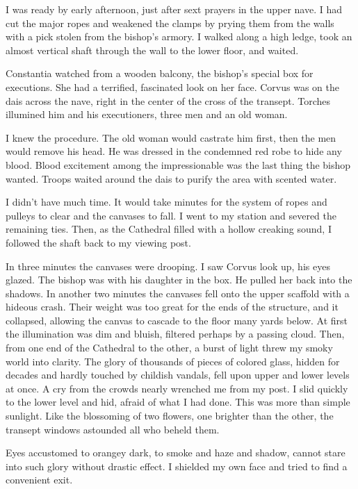 I was ready by early afternoon, just after sext prayers in the upper nave. I had cut the major ropes and weakened the clamps by prying them from the walls with a pick stolen from the bishop's armory. I walked along a high ledge, took an almost vertical shaft through the wall to the lower floor, and waited.

Constantia watched from a wooden balcony, the bishop's special box for executions. She had a terrified, fascinated look on her face. Corvus was on the dais across the nave, right in the center of the cross of the transept. Torches illumined him and his executioners, three men and an old woman.

I knew the procedure. The old woman would castrate him first, then the men would remove his head. He was dressed in the condemned red robe to hide any blood. Blood excitement among the impressionable was the last thing the bishop wanted. Troops waited around the dais to purify the area with scented water.

I didn't have much time. It would take minutes for the system of ropes and pulleys to clear and the canvases to fall. I went to my station and severed the remaining ties. Then, as the Cathedral filled with a hollow creaking sound, I followed the shaft back to my viewing post.

In three minutes the canvases were drooping. I saw Corvus look up, his eyes glazed. The bishop was with his daughter in the box. He pulled her back into the shadows. In another two minutes the canvases fell onto the upper scaffold with a hideous crash. Their weight was too great for the ends of the structure, and it collapsed, allowing the canvas to cascade to the floor many yards below. At first the illumination was dim and bluish, filtered perhaps by a passing cloud. Then, from one end of the Cathedral to the other, a burst of light threw my smoky world into clarity. The glory of thousands of pieces of colored glass, hidden for decades and hardly touched by childish vandals, fell upon upper and lower levels at once. A cry from the crowds nearly wrenched me from my post. I slid quickly to the lower level and hid, afraid of what I had done. This was more than simple sunlight. Like the blossoming of two flowers, one brighter than the other, the transept windows astounded all who beheld them.

Eyes accustomed to orangey dark, to smoke and haze and shadow, cannot stare into such glory without drastic effect. I shielded my own face and tried to find a convenient exit.

